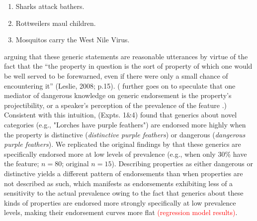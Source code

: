 \documentclass[floatsintext, 11pt, doc]{apa6}
\newcommand{\red}[1]{\textcolor{Red}{#1}}
\begin{document}
\begin{enumerate}
\item Sharks attack bathers.
\item Rottweilers maul children. 
\item Mosquitos carry the West Nile Virus.
\end{enumerate}

\noindent arguing that these generic statements are reasonable utterances by virtue of the fact that the ``the property in question is the sort of property of which one would be well served to be forewarned, even if there were only a small chance of encountering it'' (Leslie, 2008; p.15).
( further goes on to speculate that one mediator of dangerous knowledge on generic endorsement is the property's projectibility, or a speaker's perception of the prevalence of the feature \cite{Rothbart1978}.)
Consistent with this intuition,   (Expts. 1\&4) found that generics about novel categories (e.g., "Lorches have purple feathers") are endorsed more highly when the property is distinctive (\emph{distinctive purple feathers}) or dangerous (\emph{dangerous purple feathers}).
We replicated the original findings by  that these generics are specifically endorsed more at low levels of prevalence (e.g., when only 30\% have the feature; $n=80$; original $n=15$). 
Describing properties as either dangerous or distinctive yields a different pattern of endorsements than when properties are not described as such, which manifests as endorsements exhibiting less of a sensitivity to the actual prevalence owing to the fact that generics about these kinds of properties are endorsed more strongly specifically at low prevalence levels, making their endorsement curves more flat \red{(regression model results)}. 
\end{document}
